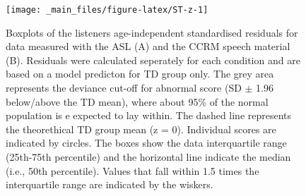 \documentclass[a4paper, twoside]{templates/ociamthesis}
\begin{document}
\begin{figure}

{\centering \texttt{[image: \_main\_files/figure-latex/ST-z-1]} 

}

\caption{Boxplots of the listeners age-independent standardised residuals for data measured with the ASL (A) and the CCRM speech material (B). Residuals were calculated seperately for each condition and are based on a model predicton for TD group only. The grey area represents the deviance cut-off for abnormal score (SD $\pm$ 1.96 below/above the TD mean), where about 95\% of the normal population is e expected to lay within. The dashed line represents the theorethical TD group mean (z = 0). Individual scores are indicated by circles. The boxes show the data interquartile range (25th-75th percentile) and the horizontal line indicate the median (i.e., 50th percentile). Values that fall within 1.5 times the interquartile range are indicated by the wiskers.}\label{fig:ST-z}
\end{figure}
\end{document}
